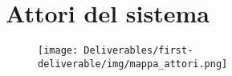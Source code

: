 \newpage
\section{Attori del sistema}
\vspace{-8mm}
\begin{figure}[!h]
    \centering
    \texttt{[image: Deliverables/first-deliverable/img/mappa\_attori.png]}
    \label{fig:mindmap}
\end{figure}

\vspace{-10mm}

\begin{attori}
    \itemc
    \end{enumerate}
\end{attori}

\newpage